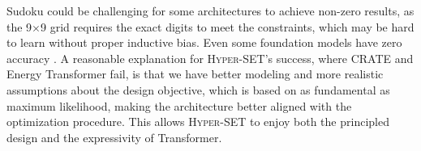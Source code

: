 Sudoku could be challenging for some architectures to achieve non-zero results, as the 9$\times$9 grid requires the exact digits to meet the constraints, which may be hard to learn without proper inductive bias. Even some foundation models have zero accuracy \citep{wang2025hierarchical}. A reasonable explanation for \textsc{Hyper-SET}’s success, where CRATE and Energy Transformer fail, is that we have better modeling and more realistic assumptions about the design objective, which is based on as fundamental as maximum likelihood, making the architecture better aligned with the optimization procedure. This allows \textsc{Hyper-SET} to enjoy both the principled design and the expressivity of Transformer.



